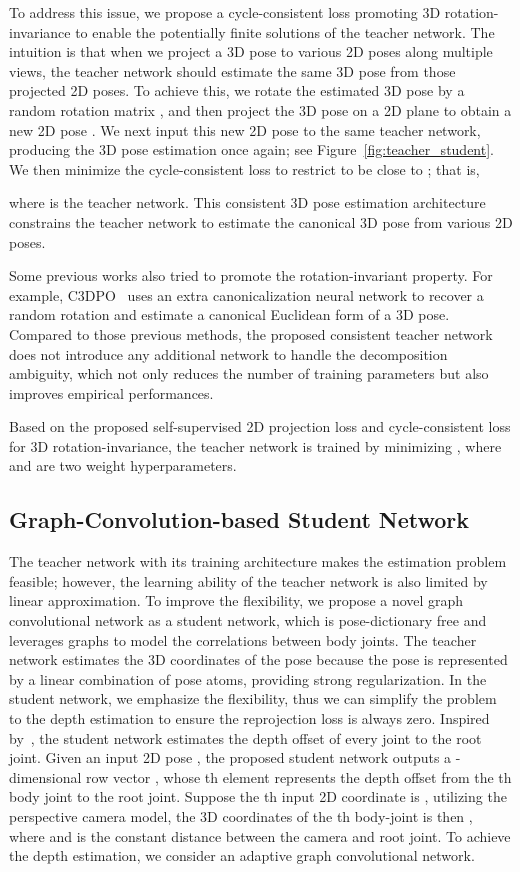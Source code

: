 \documentclass[letterpaper]{article} \usepackage{aaai21}  \usepackage{times}  \usepackage{helvet} \usepackage{courier}  \usepackage[hyphens]{url}  \usepackage{graphicx} \urlstyle{rm} \def\UrlFont{\rm}  \usepackage{natbib}  \usepackage{caption} \frenchspacing  \setlength{\pdfpagewidth}{8.5in}  \setlength{\pdfpageheight}{11in}
\begin{document}
To address this issue, we propose a cycle-consistent loss promoting 3D rotation-invariance to enable the potentially finite solutions of the teacher network. The intuition is that when we project a 3D pose to various 2D poses along multiple views, the teacher network should estimate the same 3D pose from those projected 2D poses. To achieve this, we rotate the estimated 3D pose  by a random rotation matrix , and then project the 3D pose on a 2D plane to obtain a new 2D pose . We next input this new 2D pose  to the same teacher network, producing the 3D pose estimation  once again; see Figure~\ref{fig:teacher_student}. We then minimize the cycle-consistent loss  to restrict  to be close to ; that is,

where  is the teacher network. This consistent 3D pose estimation architecture constrains the teacher network to estimate the canonical 3D pose from various 2D poses. 

Some previous works also tried to promote the rotation-invariant property. For example, C3DPO~\cite{novotny2019c3dpo} uses an extra canonicalization neural network to recover a random rotation and estimate a canonical Euclidean form of a 3D pose. Compared to those previous methods, the proposed consistent teacher network does not introduce any additional network to handle the decomposition ambiguity, which not only reduces the number of training parameters but also improves empirical performances.

Based on the proposed self-supervised 2D projection loss and cycle-consistent loss for 3D rotation-invariance, the teacher network is trained by minimizing , 
where  and  are two weight hyperparameters.

\subsection{Graph-Convolution-based Student Network}
\label{sec:student}
The teacher network with its training architecture makes the estimation problem feasible; however, the learning ability of the teacher network is also limited by linear approximation. To improve the flexibility, we propose a novel graph convolutional network as a student network, which is pose-dictionary free and leverages graphs to model the correlations between body joints. 
The teacher network estimates the 3D coordinates of the pose because the pose is represented by a linear combination of pose atoms, providing strong regularization. In the student network, we emphasize the flexibility, thus we can simplify the problem to the depth estimation to ensure the reprojection loss is always zero. Inspired by~\cite{chen2019unsupervised}, the student network estimates the depth offset of every joint to the root joint. Given an input 2D pose , the proposed student network outputs a -dimensional row vector , whose th element  represents the depth offset from the th body joint to the root joint. Suppose the th input 2D coordinate is , utilizing the perspective camera model, the 3D coordinates of the th body-joint  is then , where  and  is the constant distance between the camera and root joint. To achieve the depth estimation, we consider an adaptive graph convolutional network.
\end{document}
